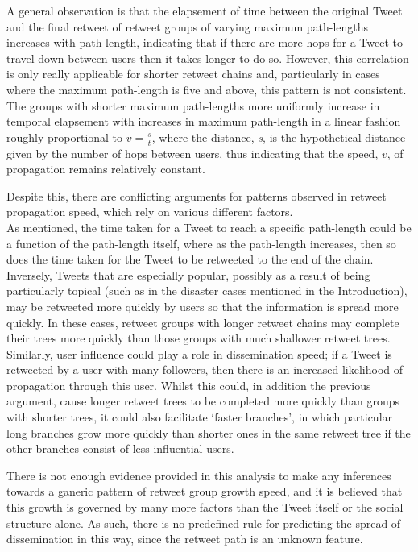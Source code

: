 A general observation is that the elapsement of time between the original Tweet and the final retweet of retweet groups of varying maximum path-lengths increases with path-length, indicating that if there are more hops for a Tweet to travel down between users then it takes longer to do so. However, this correlation is only really applicable for shorter retweet chains and, particularly in cases where the maximum path-length is five and above, this pattern is not consistent.\\
The groups with shorter maximum path-lengths more uniformly increase in temporal elapsement with increases in maximum path-length in a linear fashion roughly proportional to $ v=\frac{s}{t} $, where the distance, \textit{s}, is the hypothetical distance given by the number of hops between users, thus indicating that the speed, $v$, of propagation remains relatively constant. 

Despite this, there are conflicting arguments for patterns observed in retweet propagation speed, which rely on various different factors.\\
As mentioned, the time taken for a Tweet to reach a specific path-length could be a function of the path-length itself, where as the path-length increases, then so does the time taken for the Tweet to be retweeted to the end of the chain.\\
Inversely, Tweets that are especially popular, possibly as a result of being particularly topical (such as in the disaster cases mentioned in the Introduction), may be retweeted more quickly by users so that the information is spread more quickly. In these cases, retweet groups with longer retweet chains may complete their trees more quickly than those groups with much shallower retweet trees.\\
Similarly, user influence could play a role in dissemination speed; if a Tweet is retweeted by a user with many followers, then there is an increased likelihood of propagation through this user. Whilst this could, in addition the previous argument, cause longer retweet trees to be completed more quickly than groups with shorter trees, it could also facilitate `faster branches', in which particular long branches grow more quickly than shorter ones in the same retweet tree if the other branches consist of less-influential users.

There is not enough evidence provided in this analysis to make any inferences towards a ganeric pattern of retweet group growth speed, and it is believed that this growth is governed by many more factors than the Tweet itself or the social structure alone. As such, there is no predefined rule for predicting the spread of dissemination in this way, since the retweet path is an unknown feature.

